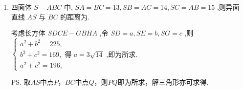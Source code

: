 \begin{enumerate}
    \item 四面体 ${S-ABC}$ 中, ${SA} = {BC} = {13},{SB} = {AC} = {14},{SC} = {AB} = {15}$ ,则异面直线 ${AS}$ 与 ${BC}$ 的距离为.
    \begin{jieda}
        考虑长方体 ${SDCE} - {GBHA}$ ,令 ${SD} = a,{SE} = b,{SG} = c$ ,则 $\left\{  \begin{array}{l} {a}^{2} + {b}^{2} = {225}, \\  {b}^{2} + {c}^{2} = {169},\text{ 得 }a = 3\sqrt{14}\text{ ,即为所求. } \\  {a}^{2} + {c}^{2} = {196}, \end{array}\right.$ 

        \ps 取$AS$中点$P$，$BC$中点$Q$，则$PQ$即为所求，解三角形亦可求得.
    \end{jieda}
\end{enumerate}